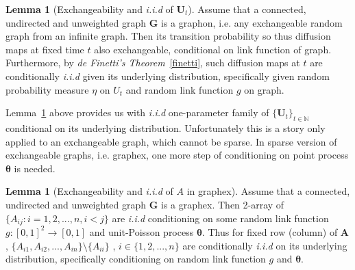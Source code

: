 \documentclass[12pt]{article}
\theoremstyle{definition}
\newtheorem{lemma}[theorem]{Lemma}
\begin{document}
\begin{lemma}[Exchangeability and \textit{i.i.d} of $\mathbf{U}_{t}$]
\label{main_lemma}
	Assume that a connected, undirected and unweighted graph $\mathbf{G}$ is a graphon, i.e. any exchangeable random graph from an infinite graph. Then its transition probability so thus diffusion maps at fixed time $t$ also exchangeable, conditional on link function of graph. Furthermore, by \textit{de Finetti's Theorem}~\ref{finetti}, such diffusion maps at $t$ are conditionally \textit{i.i.d} given its underlying distribution, specifically given random probability measure $\eta$ on $U_{t}$ and random link function $g$ on graph.    
\end{lemma}
	
Lemma~\ref{main_lemma} above provides us with \textit{i.i.d} one-parameter family of $\{ \mathbf{U}_{t} \}_{t \in \mathbb{N}}$ conditional on its underlying distribution. Unfortunately this is a story only applied to an exchangeable graph, which cannot be sparse. In sparse version of exchangeable graphs, i.e. graphex, one more step of conditioning on point process $\mathbf{\theta}$ is needed.  
	
\begin{lemma}[Exchangeability and \textit{i.i.d} of $A$ in graphex]
\label{lemma_graphex}
Assume that a connected, undirected and unweighted graph $\mathbf{G}$ is a graphex. Then 2-array of $\{ A_{ij} : i = 1,2,... ,n , i < j \}$ are  \textit{i.i.d} conditioning on some random link function $g : [0,1]^2 \rightarrow [0,1]$ and unit-Poisson process $\mathbf{\theta}$. Thus for fixed row (column) of $\mathbf{A}$, $\{ A_{i1}, A_{i2}, ... , A_{in} \} \setminus \{ A_{ii} \} $ , $i \in \{ 1,2,... , n \}$ are conditionally \textit{i.i.d} on its underlying distribution, specifically conditioning on random link function $g$ and $\mathbf{\theta}$.  
\end{lemma}	
\end{document}
